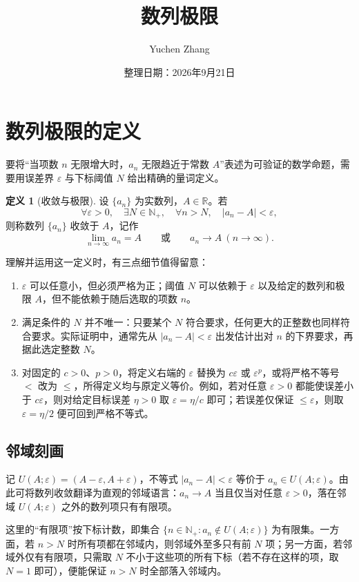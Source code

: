 \documentclass[UTF8, fontset=fandol, a4paper, 12pt]{ctexart}
\title{数列极限}
\author{Yuchen Zhang}
\date{整理日期：2026年9月21日}
\makeatletter
\newcommand{\R}{\mathbb R}
\newcommand{\Nplus}{\mathbb N_{+}}
\theoremstyle{definition}
\newtheorem{definition}{定义}[section]
\renewcommand{\maketitle}{\begin{center}
{\LARGE\bfseries \@title\par}\vspace{0.6em}
\@author\par\vspace{0.2em}{\small\@date\par}
\end{center}}
\makeatother
\begin{document}
\maketitle
\section{数列极限的定义}
要将“当项数 $n$ 无限增大时，$a_n$ 无限趋近于常数 $A$”表述为可验证的数学命题，需要用误差界 $\varepsilon$ 与下标阈值 $N$ 给出精确的量词定义。

\begin{definition}[收敛与极限]
设 $\{a_n\}$ 为实数列，$A\in\R$。若
\[
 \forall\varepsilon>0,\quad\exists N\in\Nplus,\quad
 \forall n>N,\quad |a_n-A|<\varepsilon,
\]
则称数列 $\{a_n\}$ 收敛于 $A$，记作
\[
 \lim_{n\to\infty}a_n=A\qquad\text{或}\qquad a_n\to A\ (n\to\infty).
\]
\end{definition}

理解并运用这一定义时，有三点细节值得留意：
\begin{enumerate}
\item $\varepsilon$ 可以任意小，但必须严格为正；阈值 $N$ 可以依赖于 $\varepsilon$ 以及给定的数列和极限 $A$，但不能依赖于随后选取的项数 $n$。
\item 满足条件的 $N$ 并不唯一：只要某个 $N$ 符合要求，任何更大的正整数也同样符合要求。实际证明中，通常先从 $|a_n-A|<\varepsilon$ 出发估计出对 $n$ 的下界要求，再据此选定整数 $N$。
\item 对固定的 $c>0$、$p>0$，将定义右端的 $\varepsilon$ 替换为 $c\varepsilon$ 或 $\varepsilon^p$，或将严格不等号 $<$ 改为 $\le$，所得定义均与原定义等价。例如，若对任意 $\varepsilon>0$ 都能使误差小于 $c\varepsilon$，则对给定目标误差 $\eta>0$ 取 $\varepsilon=\eta/c$ 即可；若误差仅保证 $\le\varepsilon$，则取 $\varepsilon=\eta/2$ 便可回到严格不等式。
\end{enumerate}

\subsection{邻域刻画}
记 $U(A;\varepsilon)=(A-\varepsilon,A+\varepsilon)$，不等式 $|a_n-A|<\varepsilon$ 等价于 $a_n\in U(A;\varepsilon)$。由此可将数列收敛翻译为直观的邻域语言：$a_n\to A$ 当且仅当对任意 $\varepsilon>0$，落在邻域 $U(A;\varepsilon)$ 之外的数列项只有有限项。

这里的“有限项”按下标计数，即集合 $\{n\in\Nplus:a_n\notin U(A;\varepsilon)\}$ 为有限集。一方面，若 $n>N$ 时所有项都在邻域内，则邻域外至多只有前 $N$ 项；另一方面，若邻域外仅有有限项，只需取 $N$ 不小于这些项的所有下标（若不存在这样的项，取 $N=1$ 即可），便能保证 $n>N$ 时全部落入邻域内。
\end{document}
